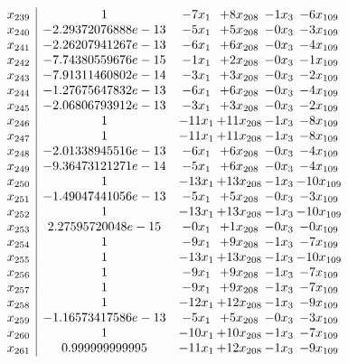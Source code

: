 \documentclass[11pt]{article}
\begin{document}
\[\begin{array}{c| c c@{\hskip 2pt} c@{\hskip 2pt} c@{\hskip 2pt} c@{\hskip 2pt} }
 x_{239}   &  1 & -7 x_{1} & + 8 x_{208} & -1 x_{3} & -6 x_{109}\\
 x_{240}   &  -2.29372076888e-13 & -5 x_{1} & + 5 x_{208} & -0 x_{3} & -3 x_{109}\\
 x_{241}   &  -2.26207941267e-13 & -6 x_{1} & + 6 x_{208} & -0 x_{3} & -4 x_{109}\\
 x_{242}   &  -7.74380559676e-15 & -1 x_{1} & + 2 x_{208} & -0 x_{3} & -1 x_{109}\\
 x_{243}   &  -7.91311460802e-14 & -3 x_{1} & + 3 x_{208} & -0 x_{3} & -2 x_{109}\\
 x_{244}   &  -1.27675647832e-13 & -6 x_{1} & + 6 x_{208} & -0 x_{3} & -4 x_{109}\\
 x_{245}   &  -2.06806793912e-13 & -3 x_{1} & + 3 x_{208} & -0 x_{3} & -2 x_{109}\\
 x_{246}   &  1 & -11 x_{1} & + 11 x_{208} & -1 x_{3} & -8 x_{109}\\
 x_{247}   &  1 & -11 x_{1} & + 11 x_{208} & -1 x_{3} & -8 x_{109}\\
 x_{248}   &  -2.01338945516e-13 & -6 x_{1} & + 6 x_{208} & -0 x_{3} & -4 x_{109}\\
 x_{249}   &  -9.36473121271e-14 & -5 x_{1} & + 6 x_{208} & -0 x_{3} & -4 x_{109}\\
 x_{250}   &  1 & -13 x_{1} & + 13 x_{208} & -1 x_{3} & -10 x_{109}\\
 x_{251}   &  -1.49047441056e-13 & -5 x_{1} & + 5 x_{208} & -0 x_{3} & -3 x_{109}\\
 x_{252}   &  1 & -13 x_{1} & + 13 x_{208} & -1 x_{3} & -10 x_{109}\\
 x_{253}   &  2.27595720048e-15 & -0 x_{1} & + 1 x_{208} & -0 x_{3} & -0 x_{109}\\
 x_{254}   &  1 & -9 x_{1} & + 9 x_{208} & -1 x_{3} & -7 x_{109}\\
 x_{255}   &  1 & -13 x_{1} & + 13 x_{208} & -1 x_{3} & -10 x_{109}\\
 x_{256}   &  1 & -9 x_{1} & + 9 x_{208} & -1 x_{3} & -7 x_{109}\\
 x_{257}   &  1 & -9 x_{1} & + 9 x_{208} & -1 x_{3} & -7 x_{109}\\
 x_{258}   &  1 & -12 x_{1} & + 12 x_{208} & -1 x_{3} & -9 x_{109}\\
 x_{259}   &  -1.16573417586e-13 & -5 x_{1} & + 5 x_{208} & -0 x_{3} & -3 x_{109}\\
 x_{260}   &  1 & -10 x_{1} & + 10 x_{208} & -1 x_{3} & -7 x_{109}\\
 x_{261}   &  0.999999999995 & -11 x_{1} & + 12 x_{208} & -1 x_{3} & -9 x_{109}\\

\end{array}\]
\end{document}

